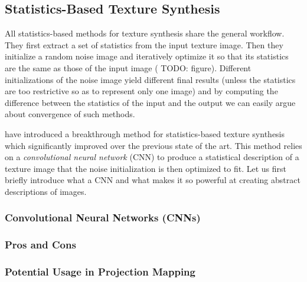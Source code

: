 \subsection{Statistics-Based Texture Synthesis}
\label{section:background-texture_synthesis-statistics_based}

All statistics-based methods for texture synthesis share the general workflow. They first extract a set of statistics from the input texture image. Then they initialize a random noise image and iteratively optimize it so that its statistics are the same as those of the input image ({\color{red} TODO: figure}). Different initializations of the noise image yield different final results (unless the statistics are too restrictive so as to represent only one image) and by computing the difference between the statistics of the input and the output we can easily argue about convergence of such methods.

\citet{Gatys2015} have introduced a breakthrough method for statistics-based texture synthesis which significantly improved over the previous state of the art. This method relies on a \textit{convolutional neural network} (CNN) to produce a statistical description of a texture image that the noise initialization is then optimized to fit. Let us first briefly introduce what a CNN and what makes it so powerful at creating abstract descriptions of images.

\subsubsection{Convolutional Neural Networks (CNNs)}
\label{section:background-texture_synthesis-statistics_based-cnns}

\subsubsection{Pros and Cons}
\label{section:background-texture_synthesis-statistics_based-pros_and_cons}

\subsubsection{Potential Usage in Projection Mapping}
\label{section:background-texture_synthesis-statistics_based-projection_mapping}